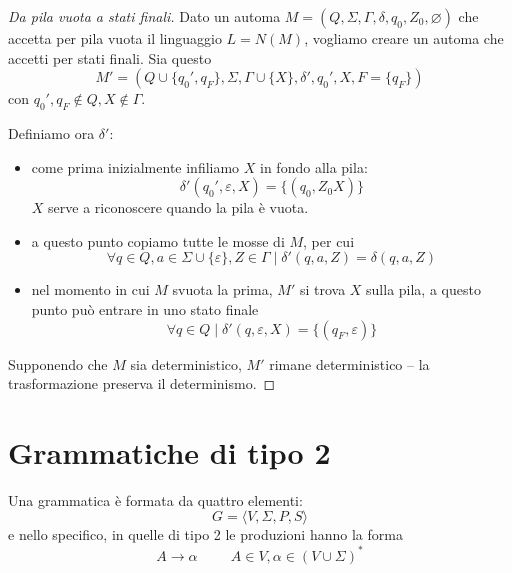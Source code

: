 \documentclass[12pt]{report}
\theoremstyle{definition}
\theoremstyle{regard}
\begin{document}
\begin{proof}[Da pila vuota a stati finali]
Dato un automa $M = (Q, \Sigma, \Gamma,\delta, q_0, Z_0, \varnothing)$ che accetta per pila vuota il linguaggio $L = N(M)$, vogliamo creare un automa che accetti per stati finali.
Sia questo 
$$M' = (Q \cup \{q_0', q_F\}, \Sigma, \Gamma \cup \{X\}, \delta', q_0', X, F = \{q_F\})$$
con $q_0', q_F \not \in Q, X \not \in \Gamma$.

Definiamo ora $\delta'$:
\begin{itemize}
	\item come prima inizialmente infiliamo $X$ in fondo alla pila:
		$$ \delta'(q_0', \varepsilon, X) = \{(q_0, Z_0X)\} $$
		$X$ serve a riconoscere quando la pila è vuota.
	\item a questo punto copiamo tutte le mosse di $M$, per cui
		$$ \forall q \in Q, a \in \Sigma \cup \{\varepsilon\}, Z \in \Gamma \mid \delta'(q, a, Z) = \delta(q, a, Z) $$
	\item nel momento in cui $M$ svuota la prima, $M'$ si trova $X$ sulla pila, a questo punto può entrare in uno stato finale
		$$ \forall q \in Q \mid \delta'(q, \varepsilon, X) = \{(q_F, \varepsilon)\}$$
\end{itemize}
Supponendo che $M$ sia deterministico, $M'$ rimane deterministico -- la trasformazione preserva il determinismo.
\end{proof}

\chapter{Grammatiche di tipo 2}
Una grammatica è formata da quattro elementi:
$$ G = \langle V, \Sigma, P, S \rangle $$
e nello specifico, in quelle di tipo 2 le produzioni hanno la forma
$$ A \rightarrow \alpha \hspace{1cm} A \in V, \alpha \in (V \cup \Sigma)^* $$
\end{document}
